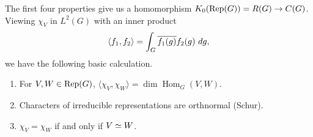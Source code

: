 The first four properties give us a homomorphism
$K_0(\mathrm{Rep}(G)) = R(G) \rightarrow C(G)$. Viewing $\chi_V$ in $L^2(G)$ with an
inner product
\[ \langle f_1, f_2 \rangle = \int_G \overline{f_1(g)} f_2(g) \ dg, \]
we have the following basic calculation.

\begin{prop}
\begin{enumerate}[(1)]
\item\label{dim-formula} For $V, W \in \mathrm{Rep}(G)$,
$\langle \chi_V, \chi_W \rangle = \dim \operatorname{Hom}_G (V, W).$
\item\label{schur} Characters of irreducible representations are orthnormal 
(Schur).
\item\label{char-iso}$\chi_V = \chi_W$ if and only if $V \simeq W$.
\end{enumerate}
\end{prop}

